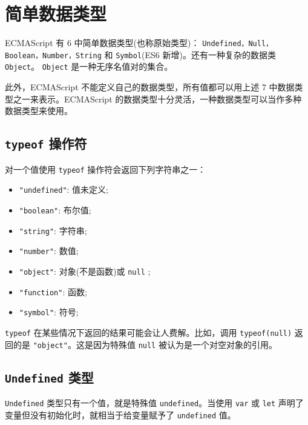 \section{简单数据类型}

ECMAScript 有 6 中简单数据类型(也称原始类型)： \texttt{Undefined，Null，Boolean，Number，String} 和 \texttt{Symbol}(ES6 新增)。还有一种复杂的数据类 \texttt{Object}。 \texttt{Object} 是一种无序名值对的集合。

此外，ECMAScript 不能定义自己的数据类型，所有值都可以用上述 7 中数据类型之一来表示。ECMAScript 的数据类型十分灵活，一种数据类型可以当作多种数据类型来使用。

\subsection{\texttt{typeof} 操作符}

对一个值使用 \texttt{typeof} 操作符会返回下列字符串之一：
\begin{itemize}
    \item \texttt{"undefined"}: 值未定义;
    \item \texttt{"boolean"}: 布尔值;
    \item \texttt{"string"}: 字符串;
    \item \texttt{"number"}: 数值;
    \item \texttt{"object"}: 对象(不是函数)或 \texttt{null} ;
    \item \texttt{"function"}: 函数;
    \item \texttt{"symbol"}: 符号;
\end{itemize}

\texttt{typeof} 在某些情况下返回的结果可能会让人费解。比如，调用 \texttt{typeof(null)} 返回的是 \texttt{"object"}。这是因为特殊值 \texttt{null} 被认为是一个对空对象的引用。


\subsection{\texttt{Undefined} 类型}

\texttt{Undefined} 类型只有一个值，就是特殊值 \texttt{undefined}。当使用 \texttt{var} 或 \texttt{let} 声明了变量但没有初始化时，就相当于给变量赋予了 \texttt{undefined} 值。

